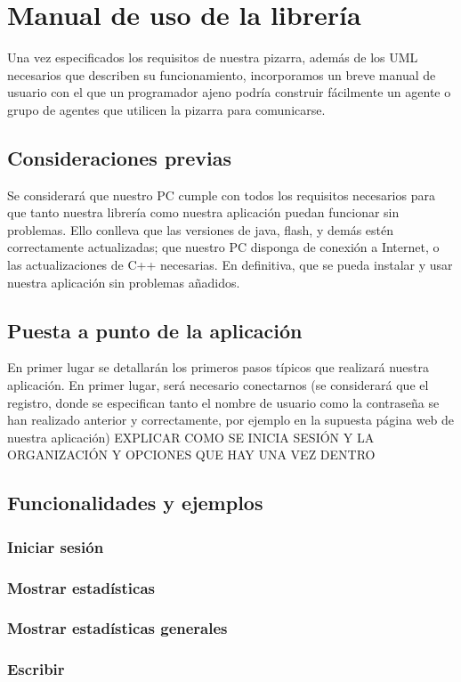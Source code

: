 \chapter{Manual de uso de la librería}
Una vez especificados los requisitos de nuestra pizarra, además de los UML necesarios que describen su funcionamiento, incorporamos un breve manual de usuario con el que un programador ajeno podría construir fácilmente un agente o grupo de agentes que utilicen la pizarra para comunicarse.

\section{Consideraciones previas}
Se considerará que nuestro PC cumple con todos los requisitos necesarios para que tanto nuestra librería como nuestra aplicación puedan funcionar sin problemas. Ello conlleva que las versiones de java, flash, y demás estén correctamente actualizadas; que nuestro PC disponga de conexión a Internet, o las actualizaciones de C++ necesarias. En definitiva, que se pueda instalar y usar nuestra aplicación sin problemas añadidos.
\section{Puesta a punto de la aplicación}
En primer lugar se detallarán los primeros pasos típicos que realizará nuestra aplicación. En primer lugar, será necesario conectarnos (se considerará que el registro, donde se especifican tanto el nombre de usuario como la contraseña se han realizado anterior y correctamente, por ejemplo en la supuesta página web de nuestra aplicación) \color{red} EXPLICAR COMO SE INICIA SESIÓN Y LA ORGANIZACIÓN Y OPCIONES QUE HAY UNA VEZ DENTRO
\color{black}
\section{Funcionalidades y ejemplos}
\subsection{Iniciar sesión}
\subsection{Mostrar estadísticas}
\subsection{Mostrar estadísticas generales}
\subsection{Escribir}
